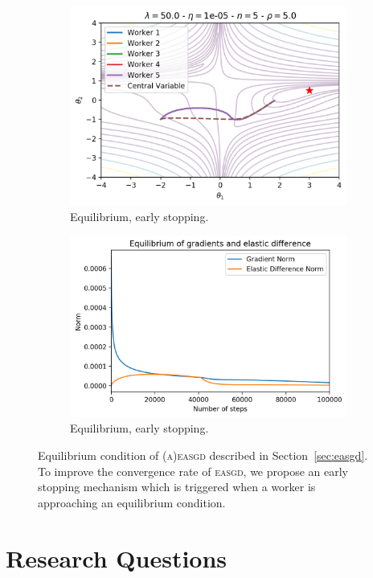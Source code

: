 \begin{figure}
\begin{subfigure}{.49\textwidth}
    \includegraphics[width=\linewidth]{resources/images/easgd_es_50_y}
    \caption{Equilibrium, early stopping.}
  \end{subfigure}
  \begin{subfigure}{.49\textwidth}
    \centering
    \includegraphics[width=\linewidth]{resources/images/easgd_es_50_y_eq}
    \caption{Equilibrium, early stopping.}
  \end{subfigure}
  \caption{Equilibrium condition of \textsc{(a)easgd} described in Section~\ref{sec:easgd}. To improve the convergence rate of \textsc{easgd}, we propose an early stopping mechanism which is triggered when a worker is approaching an equilibrium condition.}
  \label{fig:conclusion_equilibrium_early_stopping}
\end{figure}

\section{Research Questions}
\label{sec:conclusion_research_questions}

